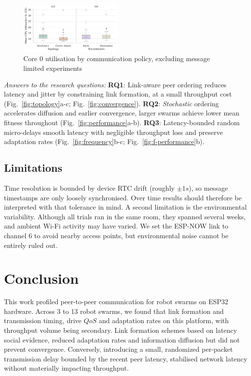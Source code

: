 \documentclass[conference]{IEEEtran}
\begin{document}
\begin{figure}[H]
    \centering
    \includegraphics[width=0.46\textwidth]{cpu_util.pdf}
    \caption{Core 0 utilisation by communication policy, excluding message limited experiments}
    \label{fig:cpu-util}
\end{figure}

\emph{Answers to the research questions:} \textbf{RQ1}: Link-aware peer ordering reduces latency and jitter by constraining link formation, at a small throughput cost (Fig.~\ref{fig:topology}a-c; Fig.~\ref{fig:convergence}). \textbf{RQ2}: \emph{Stochastic} ordering accelerates diffusion and earlier convergence, larger swarms achieve lower mean fitness throughout (Fig.~\ref{fig:performance}a-b). \textbf{RQ3}: Latency-bounded random micro-delays smooth latency with negligible throughput loss and preserve adaptation rates (Fig.~\ref{fig:frequency}b-c; Fig.~\ref{fig:f-performance}b).

\subsection{Limitations}

Time resolution is bounded by device RTC drift (roughly $\pm1s$), so message timestamps are only loosely synchronised. Over time results should therefore be interpreted with that tolerance in mind. A second limitation is the environmental variability. Although all trials ran in the same room, they spanned several weeks, and ambient Wi-Fi activity may have varied. We set the ESP-NOW link to channel 6 to avoid nearby access points, but environmental noise cannot be entirely ruled out.

\section{Conclusion}

This work profiled peer-to-peer communication for robot swarms on ESP32 hardware. Across 3 to 13 robot swarms, we found that link formation and transmission timing, drive $QoS$ and adaptation rates on this platform, with throughput volume being secondary. Link formation schemes based on latency social evidence, reduced adaptation rates and information diffusion but did not prevent convergence. Conversely, introducing a small, randomized per-packet transmission delay bounded by the recent peer latency, stabilised network latency without materially impacting throughput.
\end{document}
